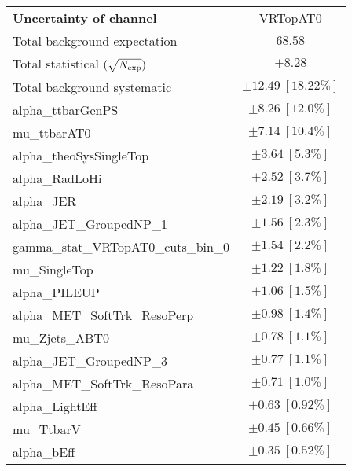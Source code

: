 
\begin{table}
\begin{center}
\setlength{\tabcolsep}{0.0pc}
\begin{tabular*}{\textwidth}{@{\extracolsep{\fill}}lc}
\noalign{\smallskip}\hline\noalign{\smallskip}
{\bf Uncertainty of channel}                                    & VRTopAT0            \\
\noalign{\smallskip}\hline\noalign{\smallskip}
Total background expectation             &  $68.58$       \\
\noalign{\smallskip}\hline\noalign{\smallskip}
Total statistical $(\sqrt{N_{\rm exp}})$              & $\pm 8.28$       \\
Total background systematic               & $\pm 12.49\ [18.22\%] $             \\
\noalign{\smallskip}\hline\noalign{\smallskip}
\noalign{\smallskip}\hline\noalign{\smallskip}
alpha\_ttbarGenPS         & $\pm 8.26\ [12.0\%] $       \\
mu\_ttbarAT0         & $\pm 7.14\ [10.4\%] $       \\
alpha\_theoSysSingleTop         & $\pm 3.64\ [5.3\%] $       \\
alpha\_RadLoHi         & $\pm 2.52\ [3.7\%] $       \\
alpha\_JER         & $\pm 2.19\ [3.2\%] $       \\
alpha\_JET\_GroupedNP\_1         & $\pm 1.56\ [2.3\%] $       \\
gamma\_stat\_VRTopAT0\_cuts\_bin\_0         & $\pm 1.54\ [2.2\%] $       \\
mu\_SingleTop         & $\pm 1.22\ [1.8\%] $       \\
alpha\_PILEUP         & $\pm 1.06\ [1.5\%] $       \\
alpha\_MET\_SoftTrk\_ResoPerp         & $\pm 0.98\ [1.4\%] $       \\
mu\_Zjets\_ABT0         & $\pm 0.78\ [1.1\%] $       \\
alpha\_JET\_GroupedNP\_3         & $\pm 0.77\ [1.1\%] $       \\
alpha\_MET\_SoftTrk\_ResoPara         & $\pm 0.71\ [1.0\%] $       \\
alpha\_LightEff         & $\pm 0.63\ [0.92\%] $       \\
mu\_TtbarV         & $\pm 0.45\ [0.66\%] $       \\
alpha\_bEff         & $\pm 0.35\ [0.52\%] $       \\

\end{tabular*}
\end{center}
\end{table}
